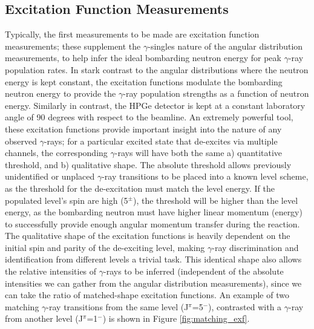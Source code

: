 \subsection{Excitation Function Measurements}
Typically, the first measurements to be made are excitation function measurements; these supplement the $\gamma$-singles nature of the angular distribution measurements, to help infer the ideal bombarding neutron energy for peak $\gamma$-ray population rates. In stark contrast to the angular distributions where the neutron energy is kept constant, the excitation functions modulate the bombarding neutron energy to provide the $\gamma$-ray population strengths as a function of neutron energy. Similarly in contrast, the HPGe detector is kept at a constant laboratory angle of 90 degrees with respect to the beamline. An extremely powerful tool, these excitation functions provide important insight into the nature of any observed $\gamma$-rays; for a particular excited state that de-excites via multiple channels, the corresponding $\gamma$-rays will have both the same a) quantitative threshold, and b) qualitative shape. The absolute threshold allows previously unidentified or unplaced $\gamma$-ray transitions to be placed into a known level scheme, as the threshold for the de-excitation must match the level energy. If the populated level's spin are high (5$^\pm$), the threshold will be higher than the level energy, as the bombarding neutron must have higher linear momentum (energy) to successfully provide enough angular momentum transfer during the reaction. The qualitative shape of the excitation functions is heavily dependent on the initial spin and parity of the de-exciting level, making $\gamma$-ray discrimination and identification from different levels a trivial task. This identical shape also allows the relative intensities of $\gamma$-rays to be inferred (independent of the absolute intensities we can gather from the angular distribution measurements), since we can take the ratio of matched-shape excitation functions. An example of two matching $\gamma$-ray transitions from the same level (J$^\pi$=5$^-$), contrasted with a $\gamma$-ray from another level (J$^\pi$=1$^-$) is shown in Figure \ref{fig:matching_exf}. 

